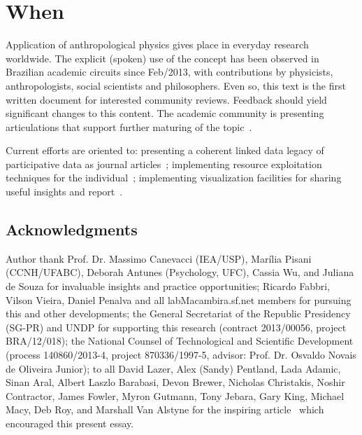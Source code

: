 \documentclass[a4paper, 11pt]{article} %
\newcommand{\aab}{\textsc{aa}}
\newcommand{\aai}{\textsc{Aa}}
\newcommand{\ontologiaa}{\textsc{o}ntologi\textsc{aa}}
\begin{document}
\section*{When}
Application of anthropological physics gives place in everyday research worldwide.
The explicit (spoken) use of the concept has been observed in Brazilian academic circuits since
Feb/2013, with contributions by physicists, anthropologists, social scientists and philosophers.
Even so, this text is the first written document for interested community reviews.
Feedback should yield significant changes to this content. The academic
community is presenting articulations that support further maturing of the topic~\cite{reunioesNexus}.

Current efforts are oriented to: presenting 
a coherent linked data legacy of participative data 
as journal articles~\cite{pnud5}; implementing
resource exploitation techniques for the individual~\cite{pnud4};
 implementing visualization facilities for sharing useful insights
and report~\cite{ocupagov,appGMANE}.

\subsection*{Acknowledgments}
Author thank Prof. Dr. Massimo Canevacci (IEA/USP), Marília Pisani (CCNH/UFABC), 
Deborah Antunes (Psychology, UFC), Cassia Wu, and Juliana de Souza for invaluable insights
and practice opportunities; Ricardo Fabbri, Vilson Vieira, Daniel Penalva and all
labMacambira.sf.net members for pursuing this and other developments;
the General Secretariat of the Republic Presidency (SG-PR) and UNDP for supporting this
research (contract 2013/00056, project BRA/12/018); the National Counsel of Technological 
and Scientific Development (process 140860/2013-4, project 870336/1997-5,
advisor: Prof. Dr. Osvaldo Novais de Oliveira Junior);
to all David Lazer, Alex (Sandy) Pentland, Lada Adamic, Sinan Aral, Albert Laszlo Barabasi, Devon Brewer, Nicholas Christakis, Noshir Contractor, James Fowler, Myron Gutmann, Tony Jebara, Gary King, Michael Macy, Deb Roy, and Marshall Van Alstyne
for the inspiring article~\cite{life} which encouraged this present essay.

\end{document}
